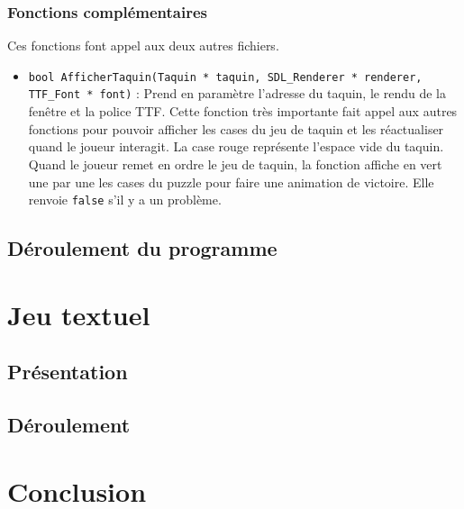 \documentclass[11pt]{article}
\begin{document}
\subsubsection{Fonctions complémentaires}
\label{sec:orgcf60a90}

Ces fonctions font appel aux deux autres fichiers.

\begin{itemize}
\item \texttt{bool AfficherTaquin(Taquin * taquin, SDL\_Renderer * renderer, TTF\_Font * font)} : Prend en paramètre l'adresse du taquin, le rendu de la fenêtre et la police TTF. Cette fonction très importante fait appel aux autres fonctions pour pouvoir afficher les cases du jeu de taquin et les réactualiser quand le joueur interagit. La case rouge représente l'espace vide du taquin. Quand le joueur remet en ordre le jeu de taquin, la fonction affiche en vert une par une les cases du puzzle pour faire une animation de victoire. Elle renvoie \texttt{false} s'il y a un problème.
\end{itemize}

\subsection{Déroulement du programme}
\label{sec:orgc9342a5}

\section{Jeu textuel}
\label{sec:org6b58df5}

\subsection{Présentation}
\label{sec:orgb051dd7}

\subsection{Déroulement}
\label{sec:orgadf8dec}

\section{Conclusion}
\label{sec:org4e7bf1b}
\end{document}
